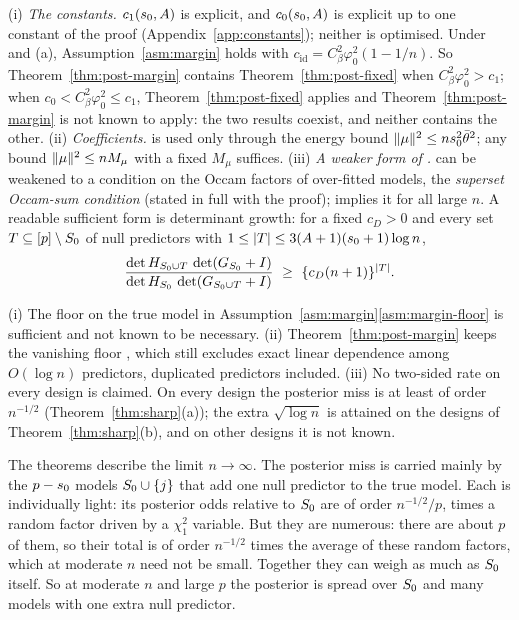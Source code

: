 \begin{remark}\label{rem:post-fixed-asm}
(i) \emph{The constants.} $c_1(s_0,A)$ is explicit, and $c_0(s_0,A)$ is explicit up to one constant of the proof
(Appendix~\ref{app:constants}); neither is optimised. Under  and (a),
Assumption~\ref{asm:margin} holds with $c_{\mathrm{id}}=C_\beta^2\varphi_0^2(1-1/n)$. So Theorem~\ref{thm:post-margin}
contains Theorem~\ref{thm:post-fixed} when $C_\beta^2\varphi_0^2>c_1$; when $c_0<C_\beta^2\varphi_0^2\le c_1$,
Theorem~\ref{thm:post-fixed} applies and Theorem~\ref{thm:post-margin} is not known to apply: the two results coexist,
and neither contains the other.
(ii) \emph{Coefficients.}  is used only through the energy bound $\lVert \mu\rVert^2\le ns_0^2\bar\theta^2$; any bound
$\lVert \mu\rVert^2\le nM_\mu$ with a fixed $M_\mu$ suffices.
(iii) \emph{A weaker form of .}  can be weakened to a condition on the Occam factors of over-fitted
models, the \emph{superset Occam-sum condition} (stated in full with the proof);  implies it for all large $n$. A
readable sufficient form is determinant growth: for a fixed $c_D>0$ and every set $T\subseteq[p]\setminus S_0$ of null
predictors with
$1\le\lvert T\rvert\le3(A+1)(s_0+1)\log n$,
\[
  \frac{\det H_{S_0\cup T}\,\det(G_{S_0}+I)}{\det H_{S_0}\,\det(G_{S_0\cup T}+I)}\ \ge\ \{c_D(n+1)\}^{\lvert T\rvert} .
\]
\end{remark}

\begin{remark}\label{rem:post-fixed-not}
(i) The floor on the true model in Assumption~\ref{asm:margin}\ref{asm:margin-floor} is sufficient and not known to be
necessary.
(ii) Theorem~\ref{thm:post-margin} keeps the vanishing floor , which still excludes exact linear dependence among
$O(\log n)$ predictors, duplicated predictors included.
(iii) No two-sided rate on every design is claimed. On every design the posterior miss is at least of order $n^{-1/2}$
(Theorem~\ref{thm:sharp}(a)); the extra $\sqrt{\log n}$ is attained on the designs of Theorem~\ref{thm:sharp}(b), and on
other designs it is not known.
\end{remark}

\begin{remark}[At moderate $n$]\label{rem:moderate}
The theorems describe the limit $n\to\infty$. The posterior miss is carried mainly by the $p-s_0$ models
$S_0\cup\{j\}$ that add one null predictor to the true model. Each is individually light: its posterior odds relative to
$S_0$ are of order $n^{-1/2}/p$, times a random factor driven by a $\chi^2_1$ variable. But they are numerous: there are
about $p$ of them, so their total is of order $n^{-1/2}$ times the average of these random factors, which at moderate $n$
need not be small. Together they can weigh as much as $S_0$ itself. So at moderate $n$ and large $p$ the posterior is spread over $S_0$ and many
models with one extra null predictor.
\end{remark}

